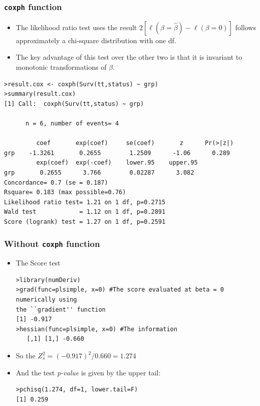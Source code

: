 \documentclass{beamer}
\newcommand{\empr}[1]{{\emph{\color{red}#1}}}
\begin{document}
\pagebreak
\begin{frame}[fragile]
\frametitle{\texttt{coxph} function}
\begin{itemize}
	\item The likelihood ratio test uses the result \empr{ $2[\ell(\beta=\hat{\beta}) - \ell(\beta=0)]$} follows approximately a chi-square distribution with one df.
	\item The key {\color{red}advantage} of this test over the other two is that it is invariant to monotonic transformations of $\beta$.
\end{itemize}
\begin{Verbatim}
>result.cox <- coxph(Surv(tt,status) ~ grp)
>summary(result.cox)
[1] Call:  coxph(Surv(tt,status) ~ grp)
      
      n = 6, number of events= 4
     
         coef       exp(coef)     se(coef)       z      Pr(>|z|)
grp    -1.3261       0.2655        1.2509      -1.06      0.289
         exp(coef)  exp(-coef)    lower.95    upper.95
grp       0.2655      3.766        0.02287      3.082
Concordance= 0.7 (se = 0.187)
Rsquare= 0.183 (max possible=0.76)
Likelihood ratio test= 1.21 on 1 df, p=0.2715
Wald test            = 1.12 on 1 df, p=0.2891
Score (logrank) test = 1.27 on 1 df, p=0.2591
\end{Verbatim}
\end{frame}

\pagebreak
\begin{frame}[fragile]
\frametitle{Without \texttt{coxph} function}
\begin{itemize}
\item The Score test
\begin{Verbatim}
>library(numDeriv)
>grad(func=plsimple, x=0) #The score evaluated at beta = 0 numerically using
the ``gradient'' function
[1] -0.917
>hessian(func=plsimple, x=0) #The information
   [,1] [1,] -0.660
\end{Verbatim}
\item So the $Z_{s}^{2} = (-0.917)^{2}/0.660 = 1.274$
\item And the test \empr{p-value} is given by the upper tail:
\begin{Verbatim}
>pchisq(1.274, df=1, lower.tail=F)
[1] 0.259
\end{Verbatim}
\end{itemize}
\end{frame}
\end{document}
